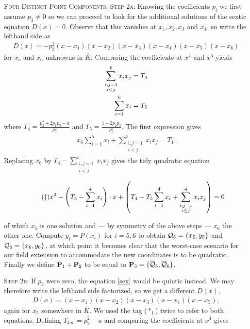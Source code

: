 \documentclass[english,11pt,a4paper]{article}
\begin{document}
\begin{case} {\scshape Four Distinct Point-Components:}
  {\scshape Step 2a:} Knowing the coefficients $p_i$ we first assume $p_3 \neq 0$ so we can proceed to look for the additional solutions of the sextic equation $D(x) = 0$.
  Observe that this vanishes at $x_1, x_2, x_3$ and $x_4$, so write the lefthand side as
  \begin{align}\tag{$*_1$}
    D(x) = -p_3^2(x-x_1)(x-x_2)(x-x_3)(x-x_4)(x-x_5)(x-x_6)
  \end{align}
   for $x_5$ and $x_6$ unknowns in $\bar K$. Comparing the coefficients at $x^4$ and $x^5$ yields
  \begin{align*}
    \sum_{\substack{i,j=1\\i<j}}^6 x_i x_j &= T_4\\
    \rlap{\hspace{-56mm}and} \sum_{i=1}^6 x_i &= T_5
  \end{align*}
  where $T_4 = \frac{p_2^2+2 p_1 p_3-a}{p_3^2}$ and $T_5 = \frac{1-2 p_2 p_3}{p_3^2}$.
  The first expression gives
  \begin{align*}
    x_6 \sum_{i=1}^5 x_i + \sum_{\substack{i,j=1\\i<j}}^5 x_i x_j = T_4.
  \end{align*}
  Replacing $x_6$ by $T_4 - \sum_{\substack{i,j=1\\i<j}}^5 x_i x_j$ gives the tidy quadratic equation

  \vspace{-2mm}
  \fline
  \begin{align*}
    \tag{$\dag$} \label{dagger} x^2 - \left(T_5 - \sumfo \right) \cdot x+ \left(T_4 - T_5 \sumfo + \sum_{\substack{i,j=1\\i\leq j}}^4 x_i x_j \right) = 0
  \end{align*}
  \fline

  of which $x_5$ is one solution and --- by symmetry of the above steps --- $x_6$ the other one. Compute $y_i=P(x_i)$ for $i=5,6$ to obtain $\q_5 = \{ x_5, y_5 \}$ and $\q_6 = \{ x_6, y_6 \}$, at which point it becomes clear that the worst-case scenario for our field extension to accommodate the new coordinates is to be quadratic. Finally we define $\P_1 + \P_2$ to be equal to $\P_3 = \{ \bar \q_5, \bar \q_6 \}$.

  {\scshape Step 2b:} If $p_3$ were zero, the equation \eqref{sex} would be quintic instead. We may therefore write the lefthand side factorized, so we get a different $D(x)$,
  \begin{align}\tag{$*_1$}
  D(x) = (x-x_1)(x-x_2)(x-x_3)(x-x_4)(x-x_5),
  \end{align}
  again for $x_5$ somewhere in $\bar K$. We used the tag ($*_1$) twice to refer to  both equations. Defining $T_{4\infty}=p_2^2 - a$ and comparing the coefficients at $x^4$ gives


\end{case}
\end{document}
